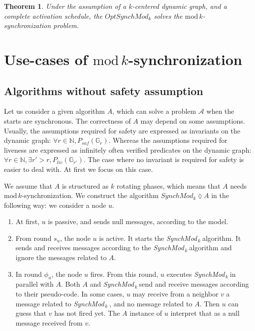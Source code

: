 \documentclass[11pt,letterpaper]{article}
\newtheorem{thm}{Theorem}
\newcommand{\tf}{\phi}
\newcommand{\SM}{{\em SynchMod}$_{\,k}\ $}
\begin{document}
\begin{thm} \label{lem:safety} 
	Under the assumption of a $k$-centered dynamic graph, and a complete activation schedule,
	the $OptSynchMod_k$ solves the $\mathrm{mod}\,k$-synchronization problem.
\end{thm}

\section{Use-cases of $\mathrm{mod}\,k$-synchronization}

\subsection{Algorithms without safety assumption}

Let us consider a given algorithm $A$, which can solve a problem $\mathcal{A}$ when the starts are synchronous.
The correctness of $A$ may depend on some assumptions.
Usually, the assumptions required for safety are expressed as invariants on the dynamic graph: $\forall r \in \mathds{N}, P_{saf}(\mathds{G}_r)$.
Whereas the assumptions required for liveness are expressed as infinitely often verified predicates on the dynamic graph: $\forall r \in \mathds{N}, \exists r' > r, P_{liv}(\mathds{G}_{r'})$.
The case where no invariant is required for safety is easier to deal with. At first we focus on this case.

We assume that $A$ is structured as $k$ rotating phases, which means that $A$ needs $\mathrm{mod}\,k$-synchronization.
We construct the algorithm $SynchMod_k \lozenge A$ in the following way:
we consider a node $u$. 
\begin{enumerate}
	\item At first, $u$ is passive, and sends null messages, according to the model.
	\item From round $s_u$, the node $u$ is active. It starts the \SM algorithm. It sends and receives messages according to the \SM algorithm and ignore the messages related to $A$.
	\item In round $\tf_u$, the node $u$ fires. From this round, $u$ executes \SM in parallel with $A$. Both $A$ and \SM send and receive messages according to their pseudo-code.
		In some cases, $u$ may receive from a neighbor $v$ a message related to \SM, and no message related to $A$. Then $u$ can guess that $v$ has not fired yet.
		The $A$ instance of $u$ interpret that as a null message received from $v$.
\end{enumerate}
\end{document}
